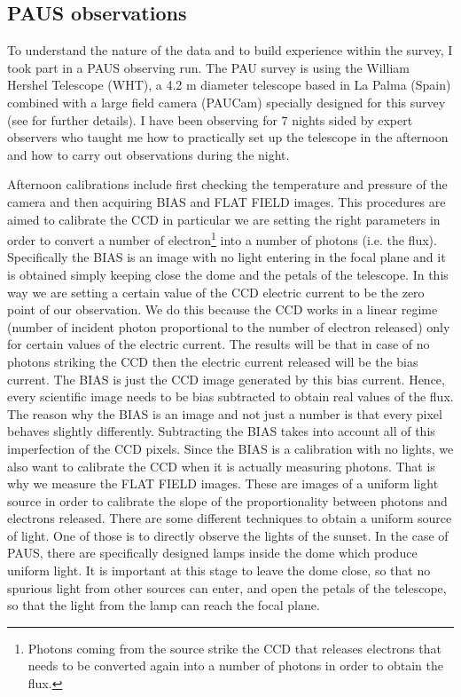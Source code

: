\documentclass[11pt]{article}
\begin{document}
\subsection{PAUS observations}
\label{sub:PAU_obs}
To understand the nature of the data and to build experience within the survey, I took part in a PAUS observing run. 
The PAU survey is using the William Hershel Telescope (WHT), a 4.2 m diameter telescope based in La Palma (Spain) combined with a large field camera (PAUCam) specially designed for this survey (see \citealt{castander12} for further details). 
I have been observing for 7 nights sided by expert observers who taught me how to practically set up the telescope in the afternoon and how to carry out observations during the night. 

Afternoon calibrations include first checking the temperature and pressure of the camera and then acquiring BIAS and FLAT FIELD images. This procedures are aimed to calibrate the CCD in particular we are setting the right parameters in order to convert a number of electron\footnote{Photons coming from the source strike the CCD that releases electrons that needs to be converted again into a number of photons in order to obtain the flux.} into a number of photons (i.e. the flux). Specifically the BIAS is an image with no light entering in the focal plane and it is obtained simply keeping close the dome and the petals of the telescope. In this way we are setting a certain value of the CCD electric current to be the zero point of our observation. We do this because the CCD works in a linear regime (number of incident photon proportional to the number of electron released) only for certain values of the electric current. The results will be that in case of no photons striking the CCD then the electric current released will be the bias current. The BIAS is just the CCD image generated by this bias current. Hence, every scientific image needs to be bias subtracted to obtain real values of the flux. The reason why the BIAS is an image and not just a number is that every pixel behaves slightly differently. Subtracting the BIAS takes into account all of this imperfection of the CCD pixels. Since the BIAS is a calibration with no lights, we also want to calibrate the CCD when it is actually measuring photons. That is why we measure the FLAT FIELD images. These are images of a uniform light source in order to calibrate the slope of the proportionality between photons and electrons released. There are some different techniques to obtain a uniform source of light. One of those is to directly observe the lights of the sunset. In the case of PAUS, there are specifically designed lamps inside the dome which produce uniform light. It is important at this stage to leave the dome close, so that no spurious light from other sources can enter, and open the petals of the telescope, so that the light from the lamp can reach the focal plane. 
\end{document}
